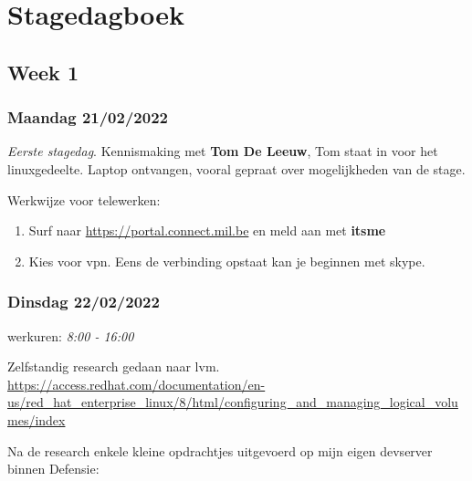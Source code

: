 
\section{Stagedagboek}
\label{sec:stagedagboek}

\subsection{Week 1}

\subsubsection{Maandag 21/02/2022}

\emph{Eerste stagedag}. Kennismaking met \textbf{Tom De Leeuw}, Tom
staat in voor het linuxgedeelte. Laptop ontvangen, vooral gepraat over mogelijkheden van de stage.

Werkwijze voor telewerken:

\begin{enumerate}
    \item Surf naar \url{https://portal.connect.mil.be} en meld aan met \textbf{itsme}
    \item Kies voor vpn. Eens de verbinding opstaat kan je beginnen met skype.
\end{enumerate}

\subsubsection{Dinsdag 22/02/2022}

werkuren: \emph{8:00 - 16:00}

Zelfstandig research gedaan naar \gls{lvm}. \url{https://access.redhat.com/documentation/en-us/red_hat_enterprise_linux/8/html/configuring_and_managing_logical_volumes/index}

Na de research enkele kleine opdrachtjes uitgevoerd op mijn eigen devserver binnen Defensie:

